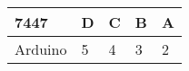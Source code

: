\begin{tabular}{|p{2cm}|p{1cm}|p{1cm}|p{1cm}|p{1cm}|}                                                  
\hline                                     
7447& D& C& B& A\\               
\hline                      
Arduino& 5& 4& 3& 2\\       
\hline                                       
\end{tabular}
